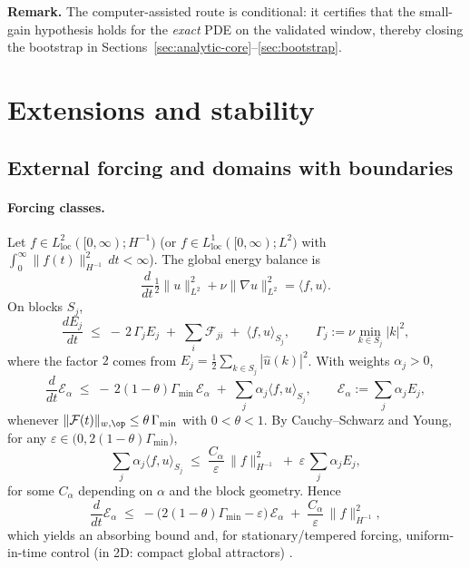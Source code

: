 \IfFileExists{nyjm.cls}{\documentclass[11pt]{nyjm}}{\documentclass[11pt]{amsart}}
\theoremstyle{plain}
\theoremstyle{definition}
\theoremstyle{remark}
\begin{document}
\medskip
\noindent\textbf{Remark.} The computer-assisted route is conditional: it certifies that the small-gain hypothesis holds for the \emph{exact} PDE on the validated window, thereby closing the bootstrap in Sections~\ref{sec:analytic-core}–\ref{sec:bootstrap}.

\section{Extensions and stability}\label{sec:extensions}

\subsection{External forcing and domains with boundaries}\label{subsec:forcing-boundary}

\paragraph{Forcing classes.}
Let $f\in L^2_{\mathrm{loc}}([0,\infty);H^{-1})$ (or $f\in L^1_{\mathrm{loc}}([0,\infty);L^2)$ with $\int_0^\infty\!\|f(t)\|_{H^{-1}}^2\,dt<\infty$). The global energy balance is
\[
\frac{d}{dt}\tfrac12\|u\|_{L^2}^2+\nu\|\nabla u\|_{L^2}^2=\langle f,u\rangle.
\]
On blocks $S_j$,
\[
\frac{dE_j}{dt}
\;\le\; -\,2\,\Gamma_j E_j\;+\;\sum_i \mathcal F_{ji}\;+\;\langle f,u\rangle_{S_j},
\qquad \Gamma_j:=\nu\min_{k\in S_j}|k|^2,
\]
where the factor $2$ comes from $E_j=\tfrac12\sum_{k\in S_j}|\widehat u(k)|^2$. With weights $\alpha_j>0$,
\[
\frac{d}{dt}\mathcal E_\alpha
\;\le\; -\,2(1-\theta)\Gamma_{\min}\,\mathcal E_\alpha
\;+\;\sum_j \alpha_j\langle f,u\rangle_{S_j},
\qquad \mathcal E_\alpha:=\sum_j \alpha_j E_j,
\]
whenever $\|\mathcal F(t)\|_{w,\op}\le \theta\,\Gamma_{\min}$ with $0<\theta<1$.
By Cauchy–Schwarz and Young, for any $\varepsilon\in\big(0,2(1-\theta)\Gamma_{\min}\big)$,
\[
\sum_j \alpha_j\langle f,u\rangle_{S_j}
\;\le\; \frac{C_\alpha}{\varepsilon}\,\|f\|_{H^{-1}}^2 \;+\; \varepsilon\,\sum_j \alpha_j E_j,
\]
for some $C_\alpha$ depending on $\alpha$ and the block geometry. Hence
\[
\frac{d}{dt}\mathcal E_\alpha \;\le\; -\big(2(1-\theta)\Gamma_{\min}-\varepsilon\big)\,\mathcal E_\alpha
\;+\;\frac{C_\alpha}{\varepsilon}\,\|f\|_{H^{-1}}^2,
\]
which yields an absorbing bound and, for stationary/tempered forcing, uniform-in-time control (in 2D: compact global attractors) \cite{Temam2001,ConstantinFoias1988}.
\end{document}
